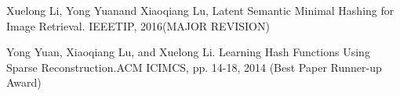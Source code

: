 

\begin{cventries}

  \cventry
    {} %
    {} %
    {} %
    {} %
    {
      \begin{cvitems} %
        \item {Xuelong Li, Yong Yuanand Xiaoqiang Lu, Latent Semantic Minimal Hashing for Image Retrieval. IEEETIP, 2016(MAJOR REVISION)}
        \item {Yong Yuan, Xiaoqiang Lu, and Xuelong Li. Learning Hash Functions Using Sparse Reconstruction.ACM ICIMCS, pp. 14-18, 2014 (Best Paper Runner-up Award)}
      \end{cvitems}
    }


\end{cventries}
